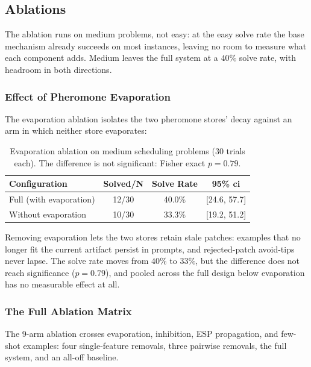 \subsection{Ablations}
\label{sec:ablations}

The ablation runs on medium problems, not easy: at the easy solve rate the base mechanism already succeeds on most instances, leaving no room to measure what each component adds. Medium leaves the full system at a $40\%$ solve rate, with headroom in both directions.

\subsubsection{Effect of Pheromone Evaporation}

The evaporation ablation isolates the two pheromone stores' decay against an arm in which neither store evaporates:

\begin{table}[htbp]
\centering
\small
\begin{tabular}{@{}lccc@{}}
\toprule
\textbf{Configuration} & \textbf{Solved/N} & \textbf{Solve Rate} & \textbf{95\% \acs{ci}} \\
\midrule
Full (with evaporation) & 12/30 & 40.0\% & [24.6, 57.7] \\
Without evaporation & 10/30 & 33.3\% & [19.2, 51.2] \\
\bottomrule
\end{tabular}
\caption{Evaporation ablation on medium scheduling problems (30 trials each). The difference is not significant: Fisher exact $p = 0.79$.}
\label{tab:decay-ablation}
\end{table}

Removing evaporation lets the two stores retain stale patches: examples that no longer fit the current artifact persist in prompts, and rejected-patch avoid-tips never lapse. The solve rate moves from $40\%$ to $33\%$, but the difference does not reach significance ($p = 0.79$), and pooled across the full design below evaporation has no measurable effect at all.

\subsubsection{The Full Ablation Matrix}

The 9-arm ablation crosses evaporation, inhibition, ESP propagation, and few-shot examples: four single-feature removals, three pairwise removals, the full system, and an all-off baseline.

